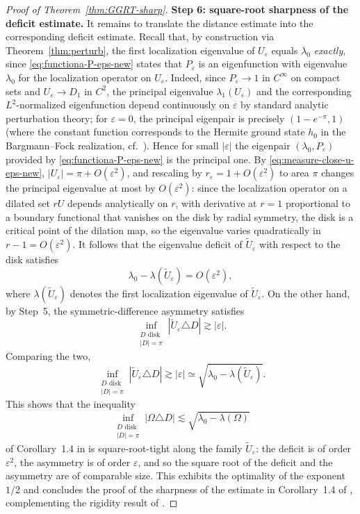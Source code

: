 \begin{proof}[Proof of Theorem~\ref{thm:GGRT-sharp}]
\medskip
\noindent
{\bf Step 6: square-root sharpness of the deficit estimate.} It remains to translate the distance estimate into the corresponding deficit
estimate. Recall that, by construction via Theorem~\ref{thm:perturb}, the
first localization eigenvalue of \(U_\varepsilon\) equals \(\lambda_0\)
\emph{exactly}, since \eqref{eq:functiona-P-eps-new} states that
\(P_\varepsilon\) is an eigenfunction with eigenvalue \(\lambda_0\) for the
localization operator on \(U_\varepsilon\). Indeed, since
\(P_\varepsilon\to 1\) in \(C^\infty\) on compact sets and \(U_\varepsilon\to D_1\)
in $C^2$, the principal eigenvalue \(\lambda_1(U_\varepsilon)\) and the
corresponding $L^2$-normalized eigenfunction depend continuously on
\(\varepsilon\) by standard analytic perturbation theory; for \(\varepsilon=0\),
the principal eigenpair is precisely \((1-e^{-\pi},1)\) (where the constant
function corresponds to the Hermite ground state $h_0$ in the Bargmann--Fock
realization, cf.~\cite{Daubechies}). Hence for small \(|\varepsilon|\) the
eigenpair \((\lambda_0,P_\varepsilon)\) provided by \eqref{eq:functiona-P-eps-new}
is the principal one. By
\eqref{eq:measure-close-u-eps-new},
\(|U_\varepsilon|=\pi+O(\varepsilon^2)\), and rescaling by
\(r_\varepsilon=1+O(\varepsilon^2)\) to area \(\pi\) changes the principal
eigenvalue at most by \(O(\varepsilon^2)\): since the localization operator
on a dilated set $rU$ depends analytically on $r$, with derivative at $r=1$
proportional to a boundary functional that vanishes on the disk by radial
symmetry, the disk is a critical point of the dilation map, so the
eigenvalue varies quadratically in \(r-1=O(\varepsilon^2)\). It follows that the eigenvalue deficit of
\(\widetilde U_\varepsilon\) with respect to the disk satisfies
\[
\lambda_0-\lambda(\widetilde U_\varepsilon)=O(\varepsilon^2),
\]
where \(\lambda(\widetilde U_\varepsilon)\) denotes the first localization
eigenvalue of \(\widetilde U_\varepsilon\). On the other hand, by Step~5,
the symmetric-difference asymmetry satisfies
\[
\inf_{\substack{D\text{ disk}\\ |D|=\pi}}|\widetilde U_\varepsilon\triangle D|
\gtrsim |\varepsilon|.
\]
Comparing the two,
\[
\inf_{\substack{D\text{ disk}\\ |D|=\pi}}|\widetilde U_\varepsilon\triangle D|
\gtrsim |\varepsilon|
\simeq
\sqrt{\lambda_0-\lambda(\widetilde U_\varepsilon)}.
\]
This shows that the inequality
\[
\inf_{\substack{D\text{ disk}\\ |D|=\pi}}
|\Omega\triangle D|
\lesssim
\sqrt{\lambda_0-\lambda(\Omega)}
\]
of Corollary~1.4 in \cite{Gomez-Guerra-Ramos-Tilli} is square-root-tight along
the family \(\widetilde U_\varepsilon\): the deficit is of order
\(\varepsilon^2\), the asymmetry is of order \(\varepsilon\), and so the
square root of the deficit and the asymmetry are of comparable size. This
exhibits the optimality of the exponent \(1/2\) and concludes the proof of the
sharpness of the estimate in Corollary~1.4 of
\cite{Gomez-Guerra-Ramos-Tilli}, complementing the rigidity result of
\cite{Nicola-Tilli}.

\end{proof}

